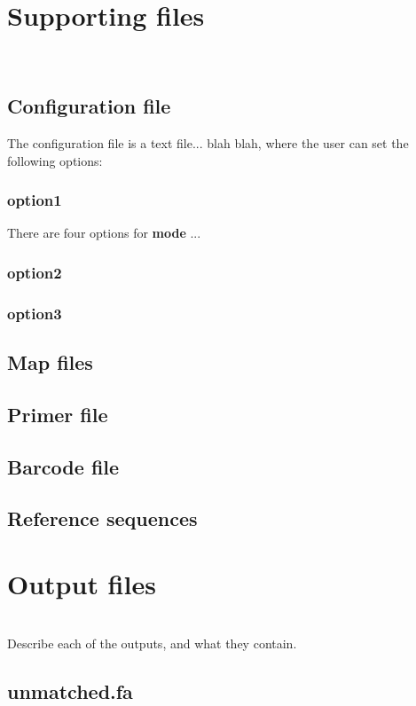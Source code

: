 \documentclass[12pt,letterpaper]{article}
\begin{document}
\bigskip\section{Supporting files}\\
\subsection{Configuration file}
The configuration file is a text file... blah blah, where the user can
set the following options:

\subsubsection{option1}
There are four options for \textbf{mode} ... 

\subsubsection{option2}

\subsubsection{option3}

\subsection{Map files}

\subsection{Primer file}

\subsection{Barcode file}

\subsection{Reference sequences}

\bigskip\section{Output files}\\
Describe each of the outputs, and what they contain.

\subsection{unmatched.fa}
\end{document}
